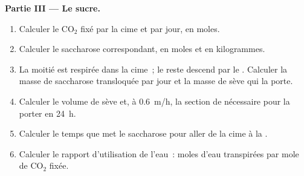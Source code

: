 \begin{problem}
\medskip
\noindent\textbf{Partie III --- Le sucre.}
\begin{enumerate}[resume]
  \item Calculer le $\mathrm{CO_2}$ fixé par la cime et par jour, en
        moles.
  \item Calculer le saccharose correspondant, en moles et en
        kilogrammes.
  \item La moitié est respirée dans la cime~; le reste descend par le
        . Calculer la masse de saccharose transloquée par jour
        et la masse de sève qui la porte.
  \item Calculer le volume de sève et, à \qty{0.6}{m/h}, la section de
         nécessaire pour la porter en \qty{24}{h}.
  \item Calculer le temps que met le saccharose pour aller de la cime
        à la .
  \item Calculer le rapport d'utilisation de l'eau~: moles d'eau
        transpirées par mole de $\mathrm{CO_2}$ fixée.
\end{enumerate}


\end{problem}
